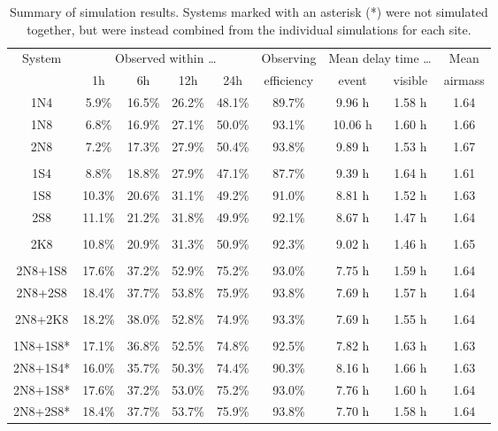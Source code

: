 \begin{colsection}
\begin{colsection}
\begin{table}[t]
\begin{center}
\begin{tabular}{c|cccc|c|cc|c}
\multirow{2}{*}{System} &
\multicolumn{4}{c|}{Observed within \ldots} &
Observing &
\multicolumn{2}{c|}{Mean delay time \ldots} &
Mean
\\
&
1h &
6h &
12h &
24h &
efficiency&
event &
visible &
airmass
\\
\midrule
1N4 & 5.9\% & 16.5\% & 26.2\% & 48.1\% & 89.7\% & 9.96 h & 1.58 h & 1.64 \\
1N8 & 6.8\% & 16.9\% & 27.1\% & 50.0\% & 93.1\% & 10.06 h & 1.60 h & 1.66 \\
2N8 & 7.2\% & 17.3\% & 27.9\% & 50.4\% & 93.8\% & 9.89 h & 1.53 h & 1.67 \\
&&&&&&&&\\
1S4 & 8.8\% & 18.8\% & 27.9\% & 47.1\% & 87.7\% & 9.39 h & 1.64 h & 1.61 \\
1S8 & 10.3\% & 20.6\% & 31.1\% & 49.2\% & 91.0\% & 8.81 h & 1.52 h & 1.63 \\
2S8 & 11.1\% & 21.2\% & 31.8\% & 49.9\% & 92.1\% & 8.67 h & 1.47 h & 1.64 \\
&&&&&&&&\\
2K8 & 10.8\% & 20.9\% & 31.3\% & 50.9\% & 92.3\% & 9.02 h & 1.46 h & 1.65 \\
&&&&&&&&\\
2N8+1S8 & 17.6\% & 37.2\% & 52.9\% & 75.2\% & 93.0\% & 7.75 h & 1.59 h & 1.64 \\
2N8+2S8 & 18.4\% & 37.7\% & 53.8\% & 75.9\% & 93.8\% & 7.69 h & 1.57 h & 1.64 \\
&&&&&&&&\\
2N8+2K8 & 18.2\% & 38.0\% & 52.8\% & 74.9\% & 93.3\% & 7.69 h & 1.55 h & 1.64 \\
&&&&&&&&\\
1N8+1S8* & 17.1\% & 36.8\% & 52.5\% & 74.8\% & 92.5\% & 7.82 h & 1.63 h & 1.63 \\
2N8+1S4* & 16.0\% & 35.7\% & 50.3\% & 74.4\% & 90.3\% & 8.16 h & 1.66 h & 1.63 \\
2N8+1S8* & 17.6\% & 37.2\% & 53.0\% & 75.2\% & 93.0\% & 7.76 h & 1.60 h & 1.64 \\
2N8+2S8* & 18.4\% & 37.7\% & 53.7\% & 75.9\% & 93.8\% & 7.70 h & 1.58 h & 1.64 \\

\end{tabular}
\end{center}
\caption[Simulation results summary]{Summary of simulation results. Systems marked with an asterisk (*) were not simulated together, but were instead combined from the individual simulations for each site.}
\label{tab:sim_results}
\end{table}


\end{colsection}
\end{colsection}

